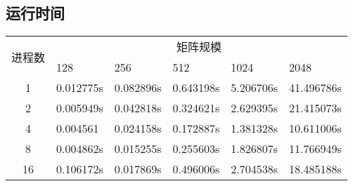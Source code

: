 \documentclass{SYSUReport}
\begin{document}
\subsection{运行时间}
\begin{table}[htpb]
\centering
\begin{tabular}{|c|lllll|}
\hline
\multirow{2}{*}{进程数} & \multicolumn{5}{c|}{矩阵规模}                                                                        \\ \cline{2-6} 
 & \multicolumn{1}{l|}{128} & \multicolumn{1}{l|}{256} & \multicolumn{1}{l|}{512} & \multicolumn{1}{l|}{1024} & 2048 \\ \hline
1                    & \multicolumn{1}{l|}{0.012775s} & \multicolumn{1}{l|}{0.082896s} & \multicolumn{1}{l|}{0.643198s} & \multicolumn{1}{l|}{5.206706s} &41.496786s\\ \hline
2                    & \multicolumn{1}{l|}{0.005949s} & \multicolumn{1}{l|}{0.042818s} & \multicolumn{1}{l|}{0.324621s} & \multicolumn{1}{l|}{2.629395s} &21.415073s\\ \hline
4                    & \multicolumn{1}{l|}{0.004561} & \multicolumn{1}{l|}{0.024158s} & \multicolumn{1}{l|}{0.172887s} & \multicolumn{1}{l|}{1.381328s} &10.611006s\\ \hline
8                   & \multicolumn{1}{l|}{0.004862s} & \multicolumn{1}{l|}{0.015255s} & \multicolumn{1}{l|}{0.255603s} & \multicolumn{1}{l|}{1.826807s} &11.766949s\\ \hline
16                   & \multicolumn{1}{l|}{0.106172s} & \multicolumn{1}{l|}{0.017869s} & \multicolumn{1}{l|}{0.496006s} & \multicolumn{1}{l|}{2.704538s} &18.485188s\\ \hline
\end{tabular}
\end{table}
\end{document}
